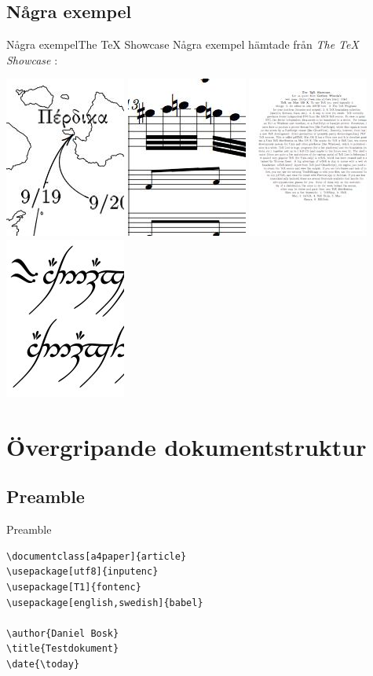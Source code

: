 \documentclass{beamer} %
\begin{document}
\subsection{Några exempel}
\begin{frame}{Några exempel}{The \TeX{} Showcase}
	Några exempel hämtade från \emph{The \TeX{} Showcase} \citep{TUG2012tsc}:
	\par
	\vspace{1cm}
	\includegraphics[width=0.2\linewidth]{maps.jpg}
	\hfill
	\includegraphics[width=0.2\linewidth]{music.jpg}
	\hfill
	\includegraphics[width=0.2\linewidth]{circular_margin.jpg}
	\hfill
	\includegraphics[width=0.2\linewidth]{tengwar.jpg}
\end{frame}


\section[Dokumentstruktur]{Övergripande dokumentstruktur}

\subsection{Preamble}
\begin{frame}[fragile]{Preamble}
	\begin{lstlisting}
\documentclass[a4paper]{article}
\usepackage[utf8]{inputenc}
\usepackage[T1]{fontenc}
\usepackage[english,swedish]{babel}

\author{Daniel Bosk}
\title{Testdokument}
\date{\today}
	\end{lstlisting}
\end{frame}
\end{document}
